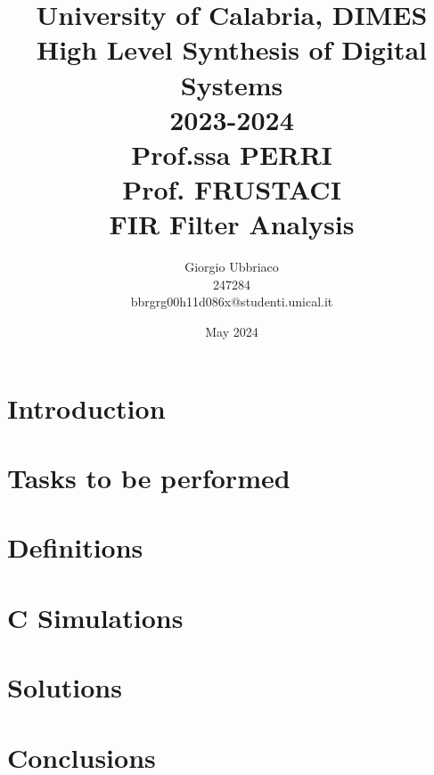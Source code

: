 \documentclass{article}
\title{University of Calabria, DIMES\\High Level Synthesis of Digital Systems\\2023-2024\\Prof.ssa PERRI\\Prof. FRUSTACI\\FIR Filter Analysis}
\author{Giorgio Ubbriaco \\ 247284 \\ bbrgrg00h11d086x@studenti.unical.it}
\date{May 2024}
\begin{document}
    \maketitle
    \renewcommand{\contentsname}{Index}
    \tableofcontents
    \newpage

    \lstlistoflistings
    \listoffigures
    \listoftables
    \newpage
    
    \section{Introduction}
    
    \newpage
    
    \section{Tasks to be performed}
    
    \newpage

    \section{Definitions}
    
    \newpage

    \section{C Simulations}
    
    \newpage
    
    \section{Solutions}
    
    \newpage

    \section{Conclusions}
    
    \newpage
    
\end{document}
